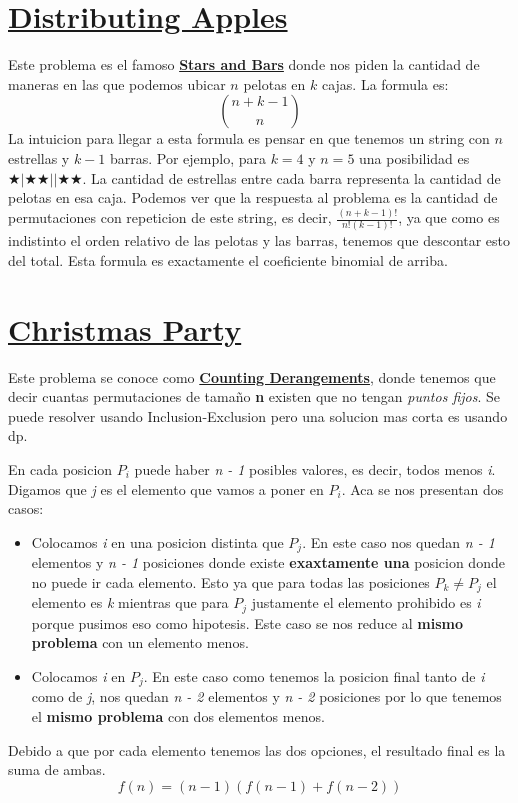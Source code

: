 \documentclass{article}
\begin{document}
\section{\href{https://cses.fi/problemset/task/1716}{Distributing Apples}}
Este problema es el famoso \href{https://cp-algorithms.com/combinatorics/stars_and_bars.html}{\textbf{Stars and Bars}} donde nos piden la cantidad de maneras en las que podemos ubicar $n$ pelotas en $k$ cajas. La formula es:
\[
\binom{n + k - 1}{n}
\]
La intuicion para llegar a esta formula es pensar en que tenemos un string con $n$ estrellas y $k - 1$ barras. Por ejemplo, para $k = 4$ y $n = 5$ una posibilidad es $\bigstar | \bigstar \bigstar || \bigstar \bigstar$. La cantidad de estrellas entre cada barra representa la cantidad de pelotas en esa caja. Podemos ver que la respuesta al problema es la cantidad de permutaciones con repeticion de este string, es decir, $\frac{(n + k - 1)!}{n!(k - 1)!}$, ya que como es indistinto el orden relativo de las pelotas y las barras, tenemos que descontar esto del total. Esta formula es exactamente el coeficiente binomial de arriba.


\section{\href{https://cses.fi/problemset/task/1717}{Christmas Party}}
Este problema se conoce como \href{https://en.wikipedia.org/wiki/Derangement}{\textbf{Counting Derangements}}, donde tenemos que decir cuantas permutaciones de tamaño \textbf{n} existen que no tengan \textit{puntos fijos}. Se puede resolver usando Inclusion-Exclusion pero una solucion mas corta es usando dp. 

En cada posicion $P_i$ puede haber \textit{n - 1} posibles valores, es decir, todos menos \textit{i}. Digamos que \textit{j} es el elemento que vamos a poner en $P_i$. Aca se nos presentan dos casos:
\begin{itemize}
    \item Colocamos \textit{i} en una posicion distinta que $P_j$. En este caso nos quedan \textit{n - 1} elementos y \textit{n - 1} posiciones donde existe \textbf{exaxtamente una} posicion donde no puede ir cada elemento. Esto ya que para todas las posiciones $P_k \neq P_j$ el elemento es \textit{k} mientras que para $P_j$ justamente el elemento prohibido es \textit{i} porque pusimos eso como hipotesis. Este caso se nos reduce al \textbf{mismo problema} con un elemento menos.
    \item Colocamos \textit{i} en $P_j$. En este caso como tenemos la posicion final tanto de \textit{i} como de \textit{j}, nos quedan \textit{n - 2} elementos y \textit{n - 2} posiciones por lo que tenemos el \textbf{mismo problema} con dos elementos menos. 
\end{itemize}
Debido a que por cada elemento tenemos las dos opciones, el resultado final es la suma de ambas.
\[
f(n) = (n - 1)(f(n - 1) + f(n - 2))
\]
\end{document}
